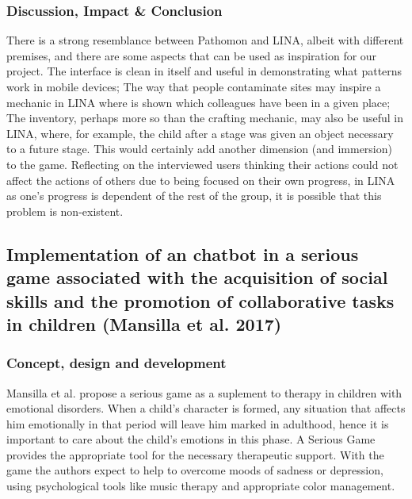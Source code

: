 \documentclass[runningheads]{llncs}
\begin{document}
\subsubsection{Discussion, Impact \& Conclusion}
\par There is a strong resemblance between Pathomon and LINA, albeit with different premises, and there are some aspects that can be used as inspiration for our project. The interface is clean in itself and useful in demonstrating what patterns work in mobile devices; The way that people contaminate sites may inspire a mechanic in LINA where is shown which colleagues have been in a given place; The inventory, perhaps more so than the crafting mechanic, may also be useful in LINA, where, for example, the child after a stage was given an object necessary to a future stage. This would certainly add another dimension (and immersion) to the game. Reflecting on the interviewed users thinking their actions could not affect the actions of others due to being focused on their own progress, in LINA as one's progress is dependent of the rest of the group, it is possible that this problem is non-existent.



\subsection{Implementation of an chatbot in a serious game associated with the acquisition of social skills and the promotion of collaborative tasks in children (Mansilla et al. 2017)}

\subsubsection{Concept, design and development}
\par Mansilla et al. propose a serious game as a suplement to therapy in children with emotional disorders. When a child's character is formed, any situation that affects him emotionally in that period will leave him marked in adulthood, hence it is important to care about the child's emotions in this phase. A Serious Game provides the appropriate tool for the necessary therapeutic support. With the game the authors expect to help to overcome moods of sadness or depression, using psychological tools like music therapy and appropriate color management.
\end{document}
